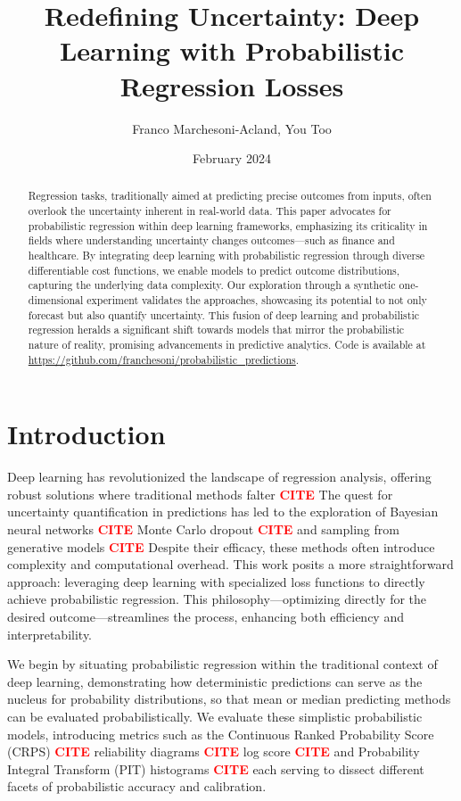 \documentclass{article}
\title{Redefining Uncertainty: Deep Learning with Probabilistic Regression Losses}
\author{Franco Marchesoni-Acland, You Too}
\date{February 2024}
\newcommand{\citee}[1]{\textbf{\textcolor{red}{CITE}}}
\begin{document}
\maketitle

\begin{abstract}
Regression tasks, traditionally aimed at predicting precise outcomes from inputs, often overlook the uncertainty inherent in real-world data. This paper advocates for probabilistic regression within deep learning frameworks, emphasizing its criticality in fields where understanding uncertainty changes outcomes—such as finance and healthcare. By integrating deep learning with probabilistic regression through diverse differentiable cost functions, we enable models to predict outcome distributions, capturing the underlying data complexity. Our exploration through a synthetic one-dimensional experiment validates the approaches, showcasing its potential to not only forecast but also quantify uncertainty. This fusion of deep learning and probabilistic regression heralds a significant shift towards models that mirror the probabilistic nature of reality, promising advancements in predictive analytics. Code is available at \url{https://github.com/franchesoni/probabilistic_predictions}.
\end{abstract}

\section{Introduction}
Deep learning has revolutionized the landscape of regression analysis, offering robust solutions where traditional methods falter \citee. The quest for uncertainty quantification in predictions has led to the exploration of Bayesian neural networks \citee, Monte Carlo dropout \citee, and sampling from generative models \citee. Despite their efficacy, these methods often introduce complexity and computational overhead. This work posits a more straightforward approach: leveraging deep learning with specialized loss functions to directly achieve probabilistic regression. This philosophy—optimizing directly for the desired outcome—streamlines the process, enhancing both efficiency and interpretability.

We begin by situating probabilistic regression within the traditional context of deep learning, demonstrating how deterministic predictions can serve as the nucleus for probability distributions, so that mean or median predicting methods can be evaluated probabilistically. We evaluate these simplistic probabilistic models, introducing metrics such as the Continuous Ranked Probability Score (CRPS) \citee, reliability diagrams \citee, log score \citee, and Probability Integral Transform (PIT) histograms \citee, each serving to dissect different facets of probabilistic accuracy and calibration.
\end{document}
